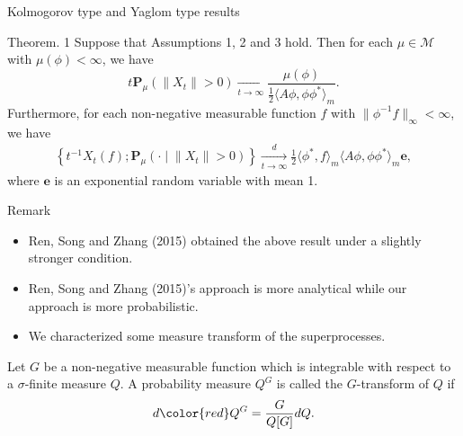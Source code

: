 \documentclass[xcolor=dvipsnames]{beamer}
\begin{document}
\begin{frame}{Kolmogorov type and Yaglom type results}
\begin{block}{Theorem. 1}
Suppose that Assumptions 1, 2 and 3 hold. 
Then for each $\mu \in \mathcal M$ with $\mu(\phi)<\infty$, we have
	\[
	t\mathbf P_\mu\left(\|X_t\| > 0\right)
	\xrightarrow[t\to\infty]{} \frac{\mu(\phi)} {\frac{1}{2}\langle  A \phi,\phi \phi^*\rangle_m}.
	\]
Furthermore, for each non-negative measurable function $f$ with $\|\phi^{-1}f\|_\infty < \infty$, we have
	\[\begin{split}
	\left\{t^{-1}X_t(f);\mathbf P_\mu\left(\cdot \middle| \| X_t\| > 0\right)\right\}
	\xrightarrow[t\to\infty]{d} \frac{1}{2}\langle \phi^*, f\rangle_m\langle A\phi, \phi\phi^*\rangle_m \mathbf e,
	\end{split}\]
	where $\mathbf e$ is an exponential random variable with mean 1.
\end{block}
\end{frame}

\begin{frame}{Remark}
\begin{itemize}
\item
Ren, Song and Zhang (2015) obtained the above result under a slightly stronger condition.
\item
Ren, Song and Zhang (2015)'s approach is more analytical while our approach is more probabilistic.
\item
We characterized some measure transform of the superprocesses.
\end{itemize}
\begin{definition}
Let $G$ be a non-negative measurable function which is integrable with respect to a $\sigma$-finite measure $Q$.
A probability measure {\color{red} $Q^G$} is called the $G$-transform of $Q$ if
  \[
    d{\color{red} Q^G} = \frac{G}{Q[G]} dQ.
  \]
\end{definition}
\end{frame}
\end{document}
